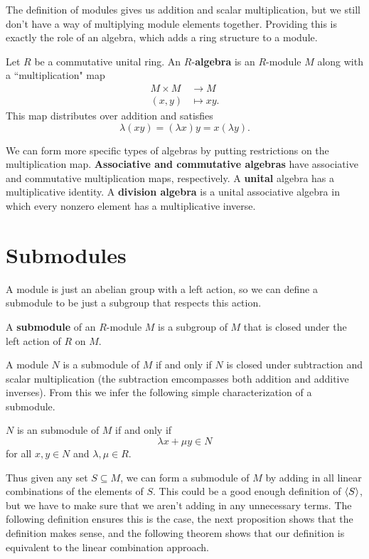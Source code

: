 \documentclass[twoside,10pt]{report}
\begin{document}
The definition of modules gives us addition and scalar multiplication, but we still don't have a way of multiplying module elements together. Providing this is exactly the role of an algebra, which adds a ring structure to a module. 

\begin{defn}[]
Let $R$ be a commutative unital ring. An $R$-\textbf{algebra} is an $R$-module $M$ along with a ``multiplication" map
\begin{align*}
	M \times M &\to M \\
	(x,y) &\mapsto xy.
\end{align*}
This map distributes over addition and satisfies
\[
	\lambda(xy) = (\lambda x)y = x (\lambda y).
\] 
\end{defn}
We can form more specific types of algebras by putting restrictions on the multiplication map. \textbf{Associative and commutative algebras} have associative and commutative multiplication maps, respectively. A \textbf{unital} algebra has a multiplicative identity. A \textbf{division algebra} is a unital associative algebra in which every nonzero element has a multiplicative inverse.

\section{Submodules}

A module is just an abelian group with a left action, so we can define a submodule to be just a subgroup that respects this action.

\begin{defn}[]
A \textbf{submodule} of an $R$-module $M$ is a subgroup of $M$ that is closed under the left action of $R$ on $M$.
\end{defn}

A module $N$ is a submodule of $M$ if and only if $N$ is closed under subtraction and scalar multiplication (the subtraction emcompasses both addition and additive inverses). From this we infer the following simple characterization of a submodule.
\begin{prop}
$N$ is an submodule of $M$ if and only if
\[
\lambda x + \mu y \in N
\] for all $x,y \in N$ and $\lambda,\mu \in R$.
\end{prop}
Thus given any set $S \subseteq M$, we can form a submodule of $M$ by adding in all linear combinations of the elements of $S$. This could be a good enough definition of $\langle S \rangle$, but we have to make sure that we aren't adding in any unnecessary terms. The following definition ensures this is the case, the next proposition shows that the definition makes sense, and the following theorem shows that our definition is equivalent to the linear combination approach.
\end{document}
